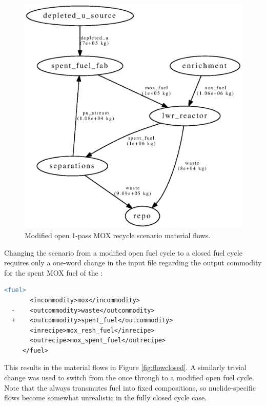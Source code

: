 \begin{figure}[H]
\begin{center}
\includegraphics{./images/flow-mod-open-1.eps}
\end{center}
\caption{Modified open 1-pass \gls{MOX} recycle scenario material flows.}
\label{fig:flowmodopen}
\end{figure}

Changing the scenario from a modified open fuel cycle to a closed fuel cycle
requires only a one-word change in the input file regarding the output
commodity for the spent \gls{MOX} fuel of the : 

\begin{lstlisting}[language=diff]
     <fuel>         
       <incommodity>mox</incommodity>
  -    <outcommodity>waste</outcommodity>
  +    <outcommodity>spent_fuel</outcommodity>
       <inrecipe>mox_resh_fuel</inrecipe>
       <outrecipe>mox_spent_fuel</outrecipe>
     </fuel>
\end{lstlisting}

This results in the material flows in Figure \ref{fig:flowclosed}.  A
similarly trivial change was used to switch from the once through to a
modified open fuel cycle.  Note that the  always transmutes
fuel into fixed compositions, so nuclide-specific flows become
somewhat unrealistic in the fully closed cycle case.

